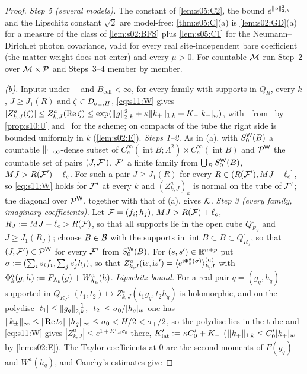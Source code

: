 \begin{proof}
\emph{Step 5 (several models).} The constant of \cref{lem:s05:C2}, the bound $e^{\lVert g\rVert^2_{2,k}}$ and the Lipschitz constant $\sqrt2$ are model-free: \cref{thm:s05:C}(a) is \cref{lem:s02:GD}(a) for a measure of the class of \cref{lem:s02:BFS} plus \cref{lem:s05:C1} for the Neumann--Dirichlet photon covariance, valid for every real site-independent bare coefficient (the matter weight does not enter) and every $\mu>0$. For countable $\mathcal M$ run Step~2 over $\mathcal M\times\mathcal{P}$ and Steps~3--4 member by member.

\emph{(b).} Inputs: under \Itwo--\Ifour\ and $B_{\mathrm{cell}}<\infty$, for every family with supports in $Q_R$, every $k$, $J\ge J_1(R)$ and $\zeta\in\mathcal D_{\sigma_+,H}$, \eqref{eq:s11:W} gives $|Z^a_{k,J}(\zeta)|\le Z^a_{k,J}(\operatorname{Re}\zeta)\le\exp(\lVert g\rVert^2_{2,k}+\kappa\lVert k_+\rVert_{1,k}+K_-\lvert k_-\rvert_{w})$, with \Itwo\ from \Tthree\ by \cref{prop:s10:U} and \SCH\ for the scheme; on compacts of the tube the right side is bounded uniformly in $k$ (\cref{lem:s02:E}).
\emph{Steps 1--2.} As in (a), with $S^{\mathsf W}_0(B)$ a countable $\lVert \cdot\rVert_\infty$-dense subset of $C^\infty_c(\operatorname{int}B;\Lambda^2)\times C^\infty_c(\operatorname{int}B)$ and $\mathcal{P}^{\mathsf W}$ the countable set of pairs $(J,\mathcal F')$, $\mathcal F'$ a finite family from $\bigcup_BS^{\mathsf W}_0(B)$, $MJ>R(\mathcal F')+\ell_c$. For such a pair $J\ge J_1(R)$ for every $R\in(R(\mathcal F'),MJ-\ell_c]$, so \eqref{eq:s11:W} holds for $\mathcal F'$ at every $k$ and $(Z^a_{k,J})_k$ is normal on the tube of $\mathcal F'$; the diagonal over $\mathcal{P}^{\mathsf W}$, together with that of (a), gives $\mathcal K$.
\emph{Step 3 (every family, imaginary coefficients).} Let $\mathcal F=(f_i;h_j)$, $MJ>R(\mathcal F)+\ell_c$, $R_J:= MJ-\ell_c>R(\mathcal F)$, so that all supports lie in the open cube $Q^\circ_{R_J}$ and $J\ge J_1(R_J)$; choose $B\in\mathcal B$ with the supports in $\operatorname{int}B\subset B\subset Q^\circ_{R_J}$, so that $(J,\mathcal F')\in\mathcal{P}^{\mathsf W}$ for every $\mathcal F'$ from $S^{\mathsf W}_0(B)$. For $(s,s')\in\mathbb R^{n+p}$ put $\sigma:=(\sum_is_if_i,\sum_js'_jh_j)$, so that $Z^a_{k,J}(\mathrm is,\mathrm is')=\langle e^{\mathrm i\Phi^a_k(\sigma)}\rangle^{(a)}_{k,J}$ with $\Phi^a_k(g,h):= F_{\Lambda_k}(g)+W^a_{\Lambda_k}(h)$. \emph{Lipschitz bound.} For a real pair $q=(g_q,h_q)$ supported in $Q_{R_J}$, $(t_1,t_2)\mapsto Z^a_{k,J}(t_1g_q,t_2h_q)$ is holomorphic, and on the polydisc $|t_1|\le\lVert g_q\rVert_{2,k}^{-1}$, $|t_2|\le\sigma_0/\lvert h_q\rvert_{w}$ one has $\lVert k_\pm\rVert_\infty\le|\operatorname{Re} t_2|\,\lVert h_q\rVert_\infty\le\sigma_0<H/2<\sigma_+/2$, so the polydisc lies in the tube and \eqref{eq:s11:W} gives $|Z^a_{k,J}|\le e^{1+K'_{\mathrm{lat}}\sigma_0}$ there, $K'_{\mathrm{lat}}:=\kappa C_0'+K_-$ ($\lVert k_+\rVert_{1,k}\le C_0'\lvert k_+\rvert_{w}$ by \cref{lem:s02:E}). The Taylor coefficients at $0$ are the second moments of $F(g_q)$ and $W^a(h_q)$, and Cauchy's estimates give

\end{proof}

